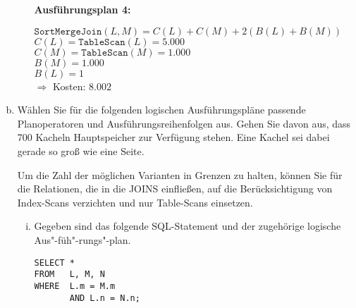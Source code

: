 \begin{enumerate}[a)]
\begin{enumerate}[i)]
\begin{note}
\textbf{Ausführungsplan 4:}

	$\mathtt{SortMergeJoin}(L,M) = C(L) + C(M) + 2(B(L) + B(M))$ \\
	$C(L) = \mathtt{TableScan}(L) = 5.000$  \\
	$C(M) = \mathtt{TableScan}(M) = 1.000$ \\
	$B(M) = 1.000$\\
	$B(L) = 1$\\
	$\Rightarrow$ Kosten: $8.002$
\end{note}

\end{enumerate}
\beamertxt{\pagebreak}

	\item Wählen Sie für die folgenden logischen Ausführungspläne passende Planoperatoren und Ausführungsreihenfolgen aus.
Gehen Sie davon aus, dass 700 Kacheln Hauptspeicher zur Verfügung stehen.
Eine Kachel sei dabei gerade so groß wie eine Seite.

Um die Zahl der möglichen Varianten in Grenzen zu halten, können Sie für die Relationen, die in die JOINS einfließen, auf die Berücksichtigung von Index-Scans verzichten und nur Table-Scans einsetzen.

	\begin{enumerate}[i)]

		\item \label{Optimierung2_1} Gegeben sind das folgende SQL-Statement und der zugehörige logische Aus"-füh"-rungs"-plan.

		\begin{minipage}{5.5cm}
		\begin{lstlisting}
SELECT *
FROM   L, M, N
WHERE  L.m = M.m
       AND L.n = N.n;
		\end{lstlisting}
		\end{minipage}
		\begin{minipage}{7cm}
		\end{minipage}


\end{enumerate}
\end{enumerate}
